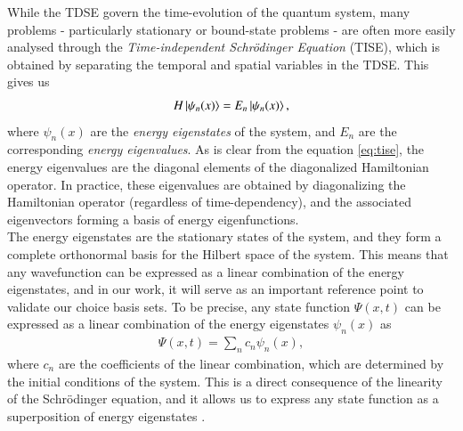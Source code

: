 \documentclass{subfiles}
\begin{document}
While the TDSE govern the time-evolution of the quantum system, many problems - particularly stationary or bound-state problems - are often more easily analysed through the \emph{Time-independent Schrödinger Equation} (TISE), which is obtained by separating the temporal and spatial variables in the TDSE. This gives us
\begin{equation}
    H\ket{\psi_n(x)} = E_n\ket{\psi_n(x)}\label{eq:tise},
\end{equation}
where $\psi_n(x)$ are the \emph{energy eigenstates} of the system, and $E_n$ are the corresponding \emph{energy eigenvalues}. As is clear from the equation \eqref{eq:tise}, the energy eigenvalues are the diagonal elements of the diagonalized Hamiltonian operator. In practice, these eigenvalues are obtained by diagonalizing the Hamiltonian operator (regardless of time-dependency), and the associated eigenvectors forming a basis of energy eigenfunctions. \\

The energy eigenstates are the stationary states of the system, and they form a complete orthonormal basis for the Hilbert space of the system. This means that any wavefunction can be expressed as a linear combination of the energy eigenstates, and in our work, it will serve as an important reference point to validate our choice basis sets. To be precise, any state function $\Psi(x, t)$ can be expressed as a linear combination of the energy eigenstates $\psi_n(x)$ as
\begin{align*}
    \Psi(x, t) = \sum_n c_n\psi_n(x),
\end{align*}
where $c_n$ are the coefficients of the linear combination, which are determined by the initial conditions of the system. This is a direct consequence of the linearity of the Schrödinger equation, and it allows us to express any state function as a superposition of energy eigenstates \cite{griffiths2018introduction, berera2021quantum}.

\end{document}
